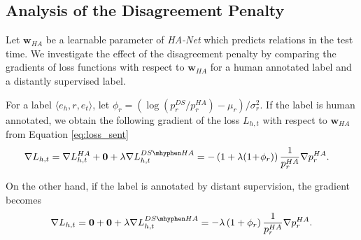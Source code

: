 \documentclass[11pt]{article}
\newcommand{\triple}[3]{\ensuremath{\langle #1,#2,#3\rangle}}
\newcommand{\hanet}{\emph{HA-Net}\xspace}
\newcommand{\ehead}{e_{h}}
\newcommand{\etail}{e_{t}}
\newcommand{\vect}[1]{\boldsymbol{\mathbf{#1}}}
\newcommand{\fracsmall}[2]{#1/#2}
\newcommand{\fracpas}[2]{(#1/#2)}
\newcommand{\plusmid}{\!+\!}
\begin{document}
\subsection{Analysis of the Disagreement Penalty}
\label{sec:analysis}
Let $\vect{w}_{HA}$ be a learnable parameter of \hanet which predicts relations in the test time.
We investigate the effect of the disagreement penalty by comparing the gradients of loss functions with respect to $\vect{w}_{HA}$ for a human annotated label and a distantly supervised label.


For a label \triple{\ehead}{r}{\etail}, let $\phi_r = \fracsmall{(\log{\fracpas{p^{DS}_{r}}{p^{HA}_{r}}} -\mu_r)}{\sigma_r^2}$.
If the label is human annotated, we obtain the following
gradient of the loss $L_{h,t}$ with respect to $\vect{w}_{HA}$ from Equation \eqref{eq:loss_sent}
\vspace{-0.03in}
\begin{equation}
\label{eq:gradha}
\vspace{-0.04in}
\begin{aligned}
\nabla L_{h,t} 
&= \nabla  L^{HA}_{h,t} + \vect{ 0} + \lambda \nabla  L^{DS\mhyphen HA}_{h,t}= - \left(1+\lambda(1 \plusmid \phi_r)\right)\frac{1}{p_r^{HA}}\nabla p_r^{HA}.
\end{aligned}
\vspace{-0.03in}
\end{equation}
 


On the other hand, if the label is annotated by distant supervision,
the gradient becomes
\vspace{-0.03in}
\begin{equation}
\label{eq:gradds}
\vspace{-0.03in}
\begin{aligned}
\nabla L_{h,t} = \vect{ 0} + \vect{ 0} + \lambda \nabla  L^{DS\mhyphen HA}_{h,t}
= -\lambda\left(1+\phi_r\right)\frac{1}{p_r^{HA}}\nabla p_r^{HA}.
\end{aligned}
\vspace{-0.03in}
\end{equation}
\end{document}

